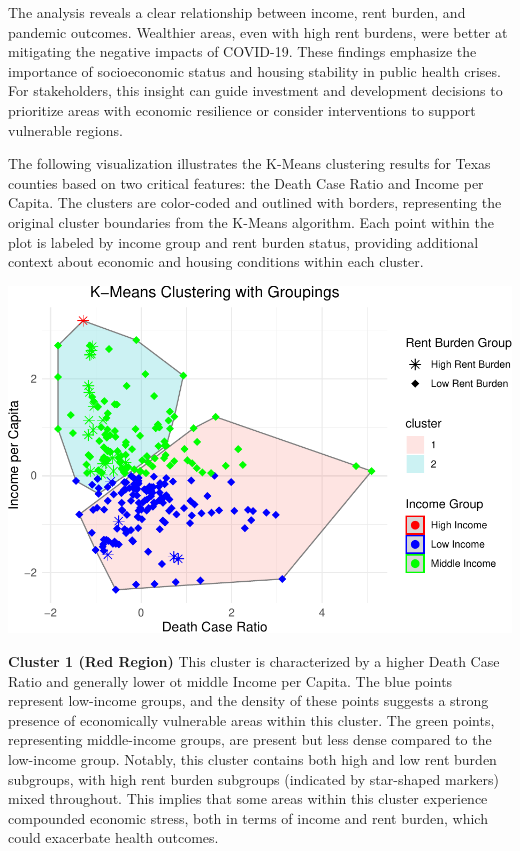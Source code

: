\documentclass[
]{article}
\begin{document}
\vspace{5pt}

The analysis reveals a clear relationship between income, rent burden,
and pandemic outcomes. Wealthier areas, even with high rent burdens,
were better at mitigating the negative impacts of COVID-19. These
findings emphasize the importance of socioeconomic status and housing
stability in public health crises. For stakeholders, this insight can
guide investment and development decisions to prioritize areas with
economic resilience or consider interventions to support vulnerable
regions.

\vspace{5pt}

The following visualization illustrates the K-Means clustering results
for Texas counties based on two critical features: the Death Case Ratio
and Income per Capita. The clusters are color-coded and outlined with
borders, representing the original cluster boundaries from the K-Means
algorithm. Each point within the plot is labeled by income group and
rent burden status, providing additional context about economic and
housing conditions within each cluster.

\vspace{10pt}

\includegraphics{Final-Report_files/figure-latex/supervised grouping on Cluster chart-1.pdf}

\vspace{10pt}

\textbf{Cluster 1 (Red Region)} This cluster is characterized by a
higher Death Case Ratio and generally lower ot middle Income per Capita.
The blue points represent low-income groups, and the density of these
points suggests a strong presence of economically vulnerable areas
within this cluster. The green points, representing middle-income
groups, are present but less dense compared to the low-income group.
Notably, this cluster contains both high and low rent burden subgroups,
with high rent burden subgroups (indicated by star-shaped markers) mixed
throughout. This implies that some areas within this cluster experience
compounded economic stress, both in terms of income and rent burden,
which could exacerbate health outcomes.
\end{document}
